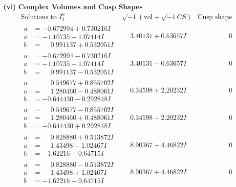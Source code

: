 \documentclass[1p]{elsarticle_modified}
\theoremstyle{definition}
\newcommand{\I}{\sqrt{-1}}
\begin{document}
\newpage\flushleft \textbf{(vi) Complex Volumes and Cusp Shapes}
$$\begin{array}{c|c|c}  
\text{Solutions to }I^u_{1}& \I (\text{vol} + \sqrt{-1}CS) & \text{Cusp shape}\\
 \hline 
\begin{aligned}
u &= -0.672994 + 0.730216 I \\
a &= -1.10735 - 1.07414 I \\
b &= \phantom{-}0.991137 + 0.532051 I\end{aligned}
 & \phantom{-}3.40131 + 0.63657 I & \phantom{-0.000000 } 0 \\ \hline\begin{aligned}
u &= -0.672994 - 0.730216 I \\
a &= -1.10735 + 1.07414 I \\
b &= \phantom{-}0.991137 - 0.532051 I\end{aligned}
 & \phantom{-}3.40131 - 0.63657 I & \phantom{-0.000000 } 0 \\ \hline\begin{aligned}
u &= \phantom{-}0.549677 + 0.855702 I \\
a &= \phantom{-}1.280460 - 0.488061 I \\
b &= -0.644430 - 0.292848 I\end{aligned}
 & \phantom{-}0.34598 + 2.20232 I & \phantom{-0.000000 } 0 \\ \hline\begin{aligned}
u &= \phantom{-}0.549677 - 0.855702 I \\
a &= \phantom{-}1.280460 + 0.488061 I \\
b &= -0.644430 + 0.292848 I\end{aligned}
 & \phantom{-}0.34598 - 2.20232 I & \phantom{-0.000000 } 0 \\ \hline\begin{aligned}
u &= \phantom{-}0.828880 + 0.513872 I \\
a &= \phantom{-}1.43498 - 1.02467 I \\
b &= -1.62216 + 0.64715 I\end{aligned}
 & \phantom{-}8.90367 - 4.46822 I & \phantom{-0.000000 } 0 \\ \hline\begin{aligned}
u &= \phantom{-}0.828880 - 0.513872 I \\
a &= \phantom{-}1.43498 + 1.02467 I \\
b &= -1.62216 - 0.64715 I\end{aligned}
 & \phantom{-}8.90367 + 4.46822 I & \phantom{-0.000000 } 0 \\ \hline\begin{aligned}

\end{aligned}
\end{array}$$
\end{document}
